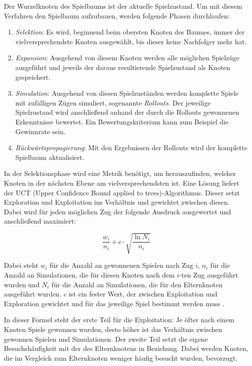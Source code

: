 \documentclass[12pt,a4paper]{article}
\begin{document}
Der Wurzelknoten des Spielbaums ist der aktuelle Spielzustand. Um mit diesem Verfahren den Spielbaum aufzubauen, werden folgende Phasen durchlaufen:
\begin{enumerate}
    \item{\textit{Selektion}:} Es wird, beginnend beim obersten Knoten des Baumes, immer der vielversprechendste Knoten ausgewählt, bis dieser keine Nachfolger mehr hat.
    \item{\textit{Expansion}:} Ausgehend von diesem Knoten werden alle möglichen Spielzüge ausgeführt und jeweils der daraus resultierende Spielzustand als Knoten gespeichert.
    \item{\textit{Simulation}:} Ausgehend von diesen Spielzuständen werden komplette Spiele mit zufälligen Zügen simuliert, sogenannte \textit{Rollouts}. Der jeweilige Spielzustand wird anschließend anhand der durch die Rollouts gewonnenen Erkenntnisse bewertet. Ein Bewertungskriterium kann zum Beispiel die Gewinnrate sein.
    \item{\textit{Rückwärtspropagierung}:} Mit den Ergebnissen der Rollouts wird der komplette Spielbaum aktualisiert.
\end{enumerate}
In der Selektionsphase wird eine Metrik benötigt, um herauszufinden, welcher Knoten in der nächsten Ebene am vielversprechendsten ist. Eine Lösung liefert der UCT (Upper Confidence Bound applied to trees)-Algorithmus. Dieser setzt Exploration und Exploitation ins Verhältnis und gewichtet zwischen diesen. Dabei wird für jeden möglichen Zug der folgende Ausdruck ausgewertet und anschließend maximiert:

\[ \frac{w_i}{n_i}+c \cdot \sqrt{\frac{\ln N_i}{n_i}} \]

Dabei steht $w_i$ für die Anzahl an gewonnenen Spielen nach Zug $i$, $n_i$ für die Anzahl an Simulationen, die für diesen Knoten nach dem $i$-ten Zug ausgeführt wurden und $N_i$ für die Anzahl an Simulationen, die für den Elternknoten ausgeführt wurden. $c$ ist ein fester Wert, der zwischen Exploitation und Exploration gewichtet und für das jeweilige Spiel bestimmt werden muss \cite{kocsis2006}. 

In dieser Formel steht der erste Teil für die Exploitation: Je öfter nach einem Knoten Spiele gewonnen wurden, desto höher ist das Verhältnis zwischen gewonnen Spielen und Simulationen. Der zweite Teil setzt die eigene Besuchshäufigkeit mit der des Elternknotens in Beziehung. Dabei werden Knoten, die im Vergleich zum Elternknoten weniger häufig besucht wurden, bevorzugt.
\end{document}
